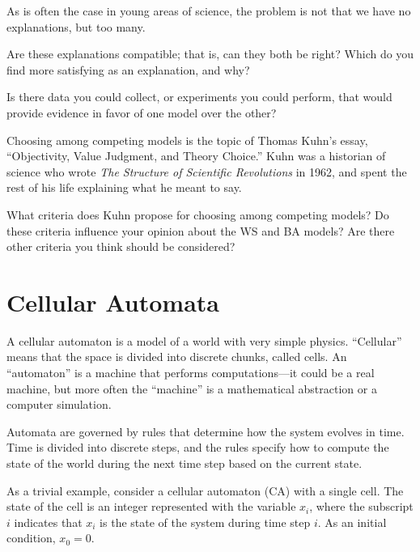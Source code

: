 \documentclass[10pt]{book}
\begin{document}
As is often the case in young areas of science, the problem is
not that we have no explanations, but too many.

\begin{exercise}

Are these explanations compatible; that is, can they both be right?
Which do you find more satisfying as an explanation, and why?

Is there data you could collect, or experiments you could perform,
that would provide evidence in favor of one model over the other?

Choosing among competing models is the topic of Thomas Kuhn's
essay, ``Objectivity, Value Judgment, and Theory Choice.''
Kuhn was a historian of science who wrote {\em The
Structure of Scientific Revolutions} in 1962, and spent the rest of
his life explaining what he meant to say.

What criteria does Kuhn propose for choosing among competing models?
Do these criteria influence your opinion about the WS and BA models?
Are there other criteria you think should be considered?

\end{exercise}



\chapter{Cellular Automata}
\label{automata}

A cellular automaton is a model of a world with very simple physics.
``Cellular'' means that the space is divided into discrete chunks,
called cells.  An ``automaton'' is a machine that performs
computations---it could be a real machine, but more often the
``machine'' is a mathematical abstraction or a computer simulation.

Automata are governed by rules that determine how the system evolves
in time.  Time is divided into discrete steps, and the rules
specify how to compute the state of the world during the next time
step based on the current state.

As a trivial example, consider a cellular automaton (CA) with
a single cell.  The state of the cell is an integer represented
with the variable $x_i$, where the subscript $i$ indicates
that $x_i$ is the state of the system during time step $i$.
As an initial condition, $x_0 = 0$.
\end{document}
